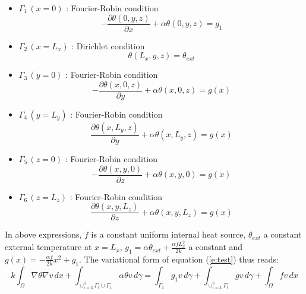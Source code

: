 \begin{itemize}
\item{ {$\Gamma_1 \,(x=0)$ : Fourier-Robin condition}\\
\begin{equation}
-\displaystyle\frac{\partial \theta(0,y,z)}{\partial x} + \alpha \theta(0,y,z) = g_1
\end{equation}	}
\item{ {$\Gamma_2 \,(x=L_x)$ : Dirichlet condition}\\
\begin{equation}
\theta(L_x,y,z)=\theta_{ext}
\end{equation}	}
\item{ {$\Gamma_3 \,(y=0)$ : Fourier-Robin condition}\\
\begin{equation}
-\displaystyle\frac{\partial \theta(x,0,z)}{\partial y} + \alpha \theta(x,0,z) = g(x)
\end{equation}	}
\item{ {$\Gamma_4 \,(y=L_y)$ : Fourier-Robin condition}\\
\begin{equation}
\displaystyle\frac{\partial \theta(x,L_y,z)}{\partial y} + \alpha \theta(x,L_y,z) = g(x)
\end{equation}	}
\item{ {$\Gamma_5 \,(z=0)$ : Fourier-Robin condition}\\
\begin{equation}
-\displaystyle\frac{\partial \theta(x,y,0)}{\partial z} + \alpha \theta(x,y,0) = g(x)
\end{equation}	}
\item{ {$\Gamma_6 \,(z=L_z)$ : Fourier-Robin condition}\\
\begin{equation}
\displaystyle\frac{\partial \theta(x,y,L_z)}{\partial z} + \alpha \theta(x,y,L_z) = g(x)
\end{equation}	}
\end{itemize}
In above expressions, $f$ is a constant uniform 
internal  heat source, $\theta_{ext}$ a constant external temperature
at $x=L_x$, $\displaystyle g_1=\alpha \theta_{ext} + \frac{\alpha f L_x^2}{2k}$ 
a constant and $\displaystyle g(x)=-\frac{\alpha f }{2 k} x^2+g_1$.
The variational form of equation (\ref{e:test}) thus reads:
\begin{equation} \label{e:testvar}
\displaystyle k \int_{\Omega} \nabla \theta \nabla v \,dx +
\int_{\displaystyle \cup_{i=3}^6 \Gamma_i \cup \Gamma_1} \alpha \theta v \, d\gamma =
\int_{\Gamma_1} g_1 v \, d\gamma +
\int_{\displaystyle \cup_{i=3}^6 \Gamma_i} g v \, d\gamma +
\int_{\Omega} f v \, dx
\end{equation}
